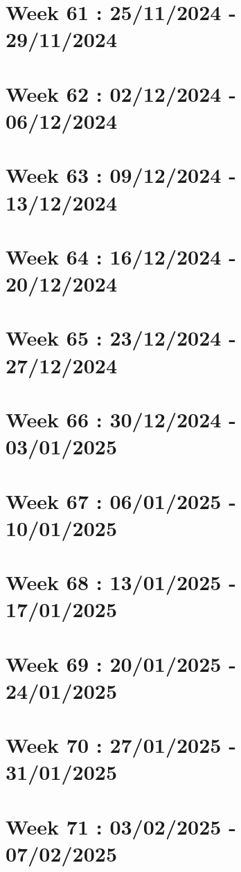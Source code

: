 \documentclass[french]{article}
\begin{document}
	\section{Week 61 : 25/11/2024 - 29/11/2024}

	\section{Week 62 : 02/12/2024 - 06/12/2024}

	\section{Week 63 : 09/12/2024 - 13/12/2024}

	\section{Week 64 : 16/12/2024 - 20/12/2024}

	\section{Week 65 : 23/12/2024 - 27/12/2024}

	\section{Week 66 : 30/12/2024 - 03/01/2025}

	\section{Week 67 : 06/01/2025 - 10/01/2025}

	\section{Week 68 : 13/01/2025 - 17/01/2025}

	\section{Week 69 : 20/01/2025 - 24/01/2025}

	\section{Week 70 : 27/01/2025 - 31/01/2025}

	\section{Week 71 : 03/02/2025 - 07/02/2025}
\end{document}
